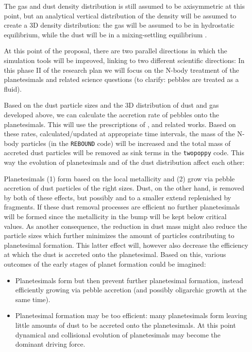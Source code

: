 \documentclass[10pt,fleqn,twoside]{article}
\newcommand{\twopoppy}{\texttt{twopoppy}\xspace}
\newcommand{\rebound}{\texttt{REBOUND}\xspace}
\begin{document}
The gas and dust density distribution is still assumed to be
axisymmetric at this point, but an analytical vertical distribution of
the density will be assumed to create a 3D density distribution: the
gas will be assumed to be in hydrostatic equilibrium, while the dust
will be in a mixing-settling equilibrium \citep{2009A&A...496..597F}.

At this point of the proposal, there are two parallel directions in
which the simulation tools will be improved, linking to two different
scientific directions:  In this phase II of the research plan
we will focus on the N-body treatment of the planetesimals and related science
questions (to clarify: pebbles are treated as a fluid).

Based on the dust particle sizes and the 3D distribution of dust and
gas developed above, we can calculate the accretion rate of pebbles
onto the planetesimals. This will use the prescriptions of
\citet{2010A&A...520A..43O}, \citet{2016A&A...586A..66V} and related
works. Based on these rates, calculated/updated at appropriate time
intervals, the mass of the N-body particles (in the \rebound code)
will be increased and the total mass of accreted dust particles will
be removed as sink terms in the \twopoppy code. This way the evolution
of planetesimals and of the dust distribution affect each other:

Planetesimals (1) form based on the local metallicity and (2) grow via
pebble accretion of dust particles of the right sizes. Dust, on the
other hand, is removed by both of these effects, but possibly and to a
smaller extend replenished by fragments. If these dust removal
processes are efficient no further planetesimals will be formed since
the metallicity in the bump will be kept below critical values.
As another consequence, the reduction in dust mass might also reduce
the particle sizes which further minimizes the amount of particles
contributing to planetesimal formation. This latter effect will,
however also decrease the efficiency at which the dust is accreted
onto the planetesimal.
Based on this, various outcomes of the early stages of planet
formation could be imagined:
\begin{itemize}
  \item Planetesimals form but then prevent further planetesimal
  formation, instead efficiently growing via pebble accretion (and
  possibly oligarchic growth at the same time).
  \item  Planetesimal formation may be too efficient: many
  planetesimals form leaving little amounts of dust to be accreted
  onto the planetesimals. At this point dynamical and collisional
  evolution of planetesimals may become the dominant driving force.
\end{itemize}
\end{document}
